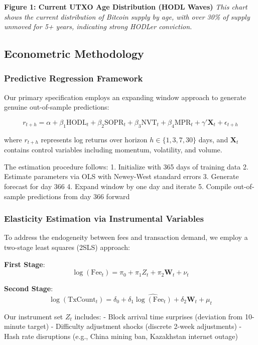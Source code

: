\documentclass[
  12pt,
  letterpaper,
  DIV=11,
  numbers=noendperiod]{scrartcl}
\begin{document}
\textbf{Figure 1: Current UTXO Age Distribution (HODL Waves)} \emph{This
chart shows the current distribution of Bitcoin supply by age, with over
30\% of supply unmoved for 5+ years, indicating strong HODLer
conviction.}

\subsection{Econometric Methodology}\label{econometric-methodology}

\subsubsection{Predictive Regression
Framework}\label{predictive-regression-framework}

Our primary specification employs an expanding window approach to
generate genuine out-of-sample predictions:

\[r_{t+h} = \alpha + \beta_1 \text{HODL}_{t} + \beta_2 \text{SOPR}_{t} + \beta_3 \text{NVT}_{t} + \beta_4 \text{MPR}_{t} + \gamma' \mathbf{X}_t + \epsilon_{t+h}\]

where \(r_{t+h}\) represents log returns over horizon
\(h \in \{1, 3, 7, 30\}\) days, and \(\mathbf{X}_t\) contains control
variables including momentum, volatility, and volume.

The estimation procedure follows: 1. Initialize with 365 days of
training data 2. Estimate parameters via OLS with Newey-West standard
errors 3. Generate forecast for day 366 4. Expand window by one day and
iterate 5. Compile out-of-sample predictions from day 366 forward

\subsubsection{Elasticity Estimation via Instrumental
Variables}\label{elasticity-estimation-via-instrumental-variables}

To address the endogeneity between fees and transaction demand, we
employ a two-stage least squares (2SLS) approach:

\textbf{First Stage}:
\[\log(\text{Fee}_{t}) = \pi_0 + \pi_1 Z_t + \pi_2 \mathbf{W}_t + \nu_t\]

\textbf{Second Stage}:
\[\log(\text{TxCount}_{t}) = \delta_0 + \delta_1 \widehat{\log(\text{Fee}_{t})} + \delta_2 \mathbf{W}_t + \mu_t\]

Our instrument set \(Z_t\) includes: - Block arrival time surprises
(deviation from 10-minute target) - Difficulty adjustment shocks
(discrete 2-week adjustments) - Hash rate disruptions (e.g., China
mining ban, Kazakhstan internet outage)
\end{document}
